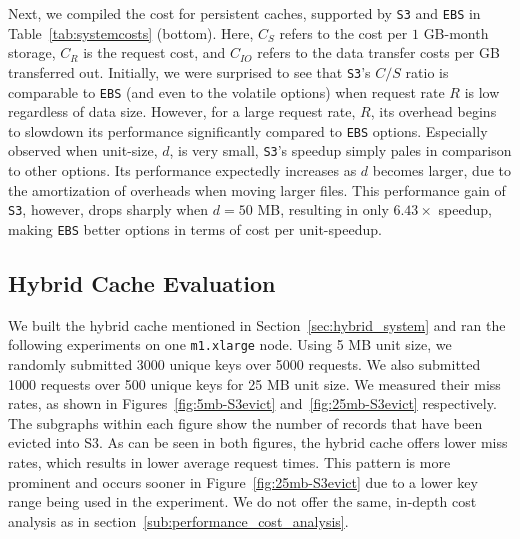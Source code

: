 Next, we compiled the cost for persistent caches, supported by {\tt S3} and
{\tt EBS} in Table~\ref{tab:systemcosts} (bottom). Here, $C_S$ refers to the
cost per $1$ GB-month storage, $C_{R}$ is the request cost, and $C_{IO}$ refers
to the data transfer costs per GB transferred out.  Initially, we were
surprised to see that {\tt S3}'s $C/S$ ratio is comparable to {\tt EBS} (and
even to the volatile options) when request rate $R$ is low regardless of data
size. However, for a large request rate, $R$, its overhead begins to slowdown
its performance significantly compared to {\tt EBS} options.  Especially
observed when unit-size, $d$, is very small, {\tt S3}'s speedup simply pales in
comparison to other options. Its performance expectedly increases as $d$
becomes larger, due to the amortization of overheads when moving larger files.
This performance gain of {\tt S3}, however, drops sharply when $d = 50$ MB,
resulting in only $6.43\times$ speedup, making {\tt EBS} better options in
terms of cost per unit-speedup.


\subsection{Hybrid Cache Evaluation} %
\label{sub:hybrid_system_evaluation}
We built the hybrid cache mentioned in Section~\ref{sec:hybrid_system} and ran
the following experiments on one {\tt m1.xlarge} node. Using 5 MB unit size, we
randomly submitted 3000 unique keys over 5000 requests. We also submitted 1000
requests over 500 unique keys for 25 MB unit size. We measured their miss
rates, as shown in Figures~\ref{fig:5mb-S3evict} and~\ref{fig:25mb-S3evict}
respectively. The subgraphs within each figure show the number of records that
have been evicted into S3. As can be seen in both figures, the hybrid cache
offers lower miss rates, which results in lower average request times. This
pattern is more prominent and occurs sooner in Figure~\ref{fig:25mb-S3evict}
due to a lower key range being used in the experiment. We do not offer the
same, in-depth cost analysis as in section~\ref{sub:performance_cost_analysis}.

